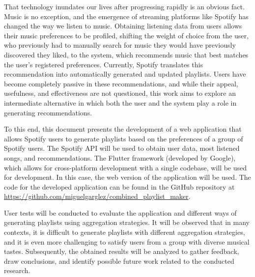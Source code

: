 That technology inundates our lives after progressing rapidly is an obvious fact.
Music is no exception, and the emergence of streaming platforms like Spotify has changed the way we listen to music.
Obtaining listening data from users allows their music preferences to be profiled, shifting the weight of choice from the user, 
who previously had to manually search for music they would have previously discovered they liked, to the system, which recommends 
music that best matches the user's registered preferences. Currently, Spotify translates this recommendation into automatically 
generated and updated playlists. Users have become completely passive in these recommendations, and while their appeal, usefulness, 
and effectiveness are not questioned, this work aims to explore an intermediate alternative in which both the user and the system 
play a role in generating recommendations.

To this end, this document presents the development of a web application that allows Spotify users to generate playlists based on the 
preferences of a group of Spotify users. The Spotify API will be used to obtain user data, most listened songs, and recommendations. 
The Flutter framework (developed by Google), which allows for cross-platform development with a single codebase, will be used for development. 
In this case, the web version of the application will be used. The code for the developed application can be found in the GitHub repository at 
\url{https://github.com/miguelgarglez/combined_playlist_maker}.

User tests will be conducted to evaluate the application and different ways of generating playlists using aggregation strategies. It will be 
observed that in many contexts, it is difficult to generate playlists with different aggregation strategies, and it is even more challenging to 
satisfy users from a group with diverse musical tastes. Subsequently, the obtained results will be analyzed to gather feedback, draw conclusions, 
and identify possible future work related to the conducted research.

